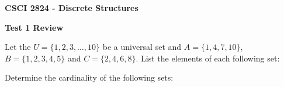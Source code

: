 \documentclass[addpoints]{exam}
\begin{document}
\singlespacing

\begin{center}
  {\large\textbf{CSCI 2824 - Discrete Structures}}

  {\large\textbf{Test 1 Review}}
\end{center}

\begin{questions}
  \question Let the $U = \{1,2,3,\dots, 10\}$ be a universal set and $A =
  \{1,4,7,10\}$, $B = \{1,2,3,4,5\}$ and $C = \{2,4,6,8\}$. List the elements
  of each following set:

  \question Determine the cardinality of the following sets:

  \begin{parts}

\end{parts}
\end{questions}
\end{document}
